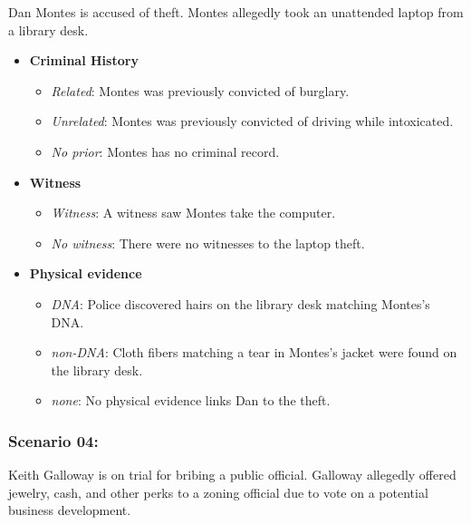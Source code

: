 \documentclass[
]{article}
\providecommand{\tightlist}{%
  \setlength{\itemsep}{0pt}\setlength{\parskip}{0pt}}
\begin{document}
Dan Montes is accused of theft. Montes allegedly took an unattended
laptop from a library desk.

\begin{itemize}
\tightlist
\item
  \textbf{Criminal History}

  \begin{itemize}
  \tightlist
  \item
    \emph{Related}: Montes was previously convicted of burglary.
  \item
    \emph{Unrelated}: Montes was previously convicted of driving while
    intoxicated.
  \item
    \emph{No prior}: Montes has no criminal record.
  \end{itemize}
\item
  \textbf{Witness}

  \begin{itemize}
  \tightlist
  \item
    \emph{Witness}: A witness saw Montes take the computer.
  \item
    \emph{No witness}: There were no witnesses to the laptop theft.
  \end{itemize}
\item
  \textbf{Physical evidence}

  \begin{itemize}
  \tightlist
  \item
    \emph{DNA}: Police discovered hairs on the library desk matching
    Montes's DNA.
  \item
    \emph{non-DNA}: Cloth fibers matching a tear in Montes's jacket were
    found on the library desk.
  \item
    \emph{none}: No physical evidence links Dan to the theft.
  \end{itemize}
\end{itemize}

\hypertarget{scenario-04}{%
\subsubsection{Scenario 04:}\label{scenario-04}}

Keith Galloway is on trial for bribing a public official. Galloway
allegedly offered jewelry, cash, and other perks to a zoning official
due to vote on a potential business development.
\end{document}
